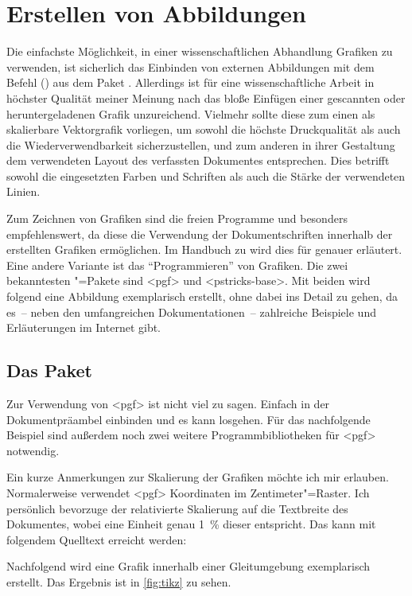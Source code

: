 \documentclass[%
  english,ngerman,%
  cdgeometry=no,DIV=12,%
  cd=false,cdfont=false,cdtitle=true,%
  headings=normal,%
  automark,%
  listof=toc,%
]{tudscrartcl}
\begin{document}
\section{Erstellen von Abbildungen}
\label{sec:figures}%
%
Die einfachste Möglichkeit, in einer wissenschaftlichen Abhandlung Grafiken zu 
verwenden, ist sicherlich das Einbinden von externen Abbildungen mit dem Befehl 
() aus dem Paket . 
Allerdings ist für eine wissenschaftliche Arbeit in höchster Qualität meiner 
Meinung nach das bloße Einfügen einer gescannten oder heruntergeladenen Grafik 
unzureichend. Vielmehr sollte diese zum einen als skalierbare Vektorgrafik 
vorliegen, um sowohl die höchste Druckqualität als auch die 
Wiederverwendbarkeit sicherzustellen, und zum anderen in ihrer Gestaltung dem 
verwendeten Layout des verfassten Dokumentes entsprechen. Dies betrifft sowohl 
die eingesetzten Farben und Schriften als auch die Stärke der verwendeten 
Linien.

Zum Zeichnen von Grafiken sind die freien Programme  und 
besonders  empfehlenswert, da diese die Verwendung der 
Dokumentschriften innerhalb der erstellten Grafiken ermöglichen. Im Handbuch zu 
\TUDScript wird dies für  
genauer erläutert. Eine andere Variante ist das \enquote{Programmieren} von 
Grafiken. Die zwei bekanntesten "=Pakete sind <pgf> 
und <pstricks-base>. Mit beiden wird folgend eine Abbildung 
exemplarisch erstellt, ohne dabei ins Detail zu gehen, da es~-- neben den 
umfangreichen Dokumentationen~-- zahlreiche Beispiele und Erläuterungen im 
Internet gibt.



\subsection{Das Paket }
Zur Verwendung von <pgf> ist nicht viel zu sagen. Einfach in der 
Dokumentpräambel einbinden und es kann losgehen. Für das nachfolgende Beispiel 
sind außerdem noch zwei weitere Programmbibliotheken für <pgf> 
notwendig.
%
\begin{Hint}
\usepackage{tikz}
\usetikzlibrary{chains}
\usetikzlibrary{decorations.markings}
\tikzset{on grid}
\end{Hint}
%
Ein kurze Anmerkungen zur Skalierung der Grafiken möchte ich mir erlauben. 
Normalerweise verwendet <pgf> Koordinaten im Zentimeter"=Raster. 
Ich persönlich bevorzuge der relativierte Skalierung auf die Textbreite des 
Dokumentes, wobei eine Einheit genau \SI{1}{\percent} dieser entspricht. Das 
kann mit folgendem Quelltext erreicht werden:
%
\CodeHook{\renewcommand\newlength[1]{}}
\begin{Hint*}
\newlength{\tikzunit}
\setlength{\tikzunit}{.01\textwidth}
\tikzset{x=\tikzunit,y=\tikzunit}
\end{Hint*}
%
Nachfolgend wird eine Grafik innerhalb einer Gleitumgebung exemplarisch 
erstellt. Das Ergebnis ist in \autoref{fig:tikz} zu sehen.
\end{document}
